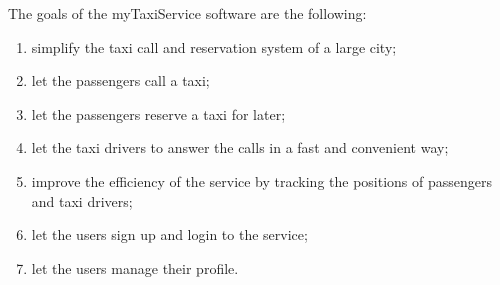 The goals of the myTaxiService software are the following:
\begin{enumerate}
	\item simplify the taxi call and reservation system of a large city; \label{g-simplify}
	\item let the passengers call a taxi;  \label{g-taxicall}
	\item let the passengers reserve a taxi for later;  \label{g-reserve}
	\item let the taxi drivers to answer the calls in a fast and convenient way;  \label{g-notify}
	\item improve the efficiency of the service by tracking the positions of passengers and taxi drivers;  \label{g-position}
	\item let the users sign up and login to the service;  \label{g-login}
	\item let the users manage their profile. \label{g-profile}
\end{enumerate}
